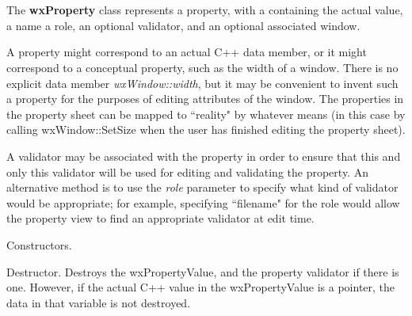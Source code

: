 \section{}\label{wxproperty}

The {\bf wxProperty} class represents a property, with a \rtfsp
containing the actual value, a name a role, an optional validator, and
an optional associated window. 

A property might correspond to an actual C++ data member, or it
might correspond to a conceptual property, such as the width of a window.
There is no explicit data member {\it wxWindow::width}, but it may be convenient
to invent such a property for the purposes of editing attributes of the window.
The properties in the property sheet can be mapped to ``reality" by
whatever means (in this case by calling wxWindow::SetSize when the user has
finished editing the property sheet).

A validator may be associated with the property in order to ensure that this and
only this validator will be used for editing and validating the property.
An alternative method is to use the {\it role} parameter to specify what kind
of validator would be appropriate; for example, specifying ``filename" for the role
would allow the property view to find an appropriate validator at edit time.







Constructors.



Destructor. Destroys the wxPropertyValue, and the property validator if there is one. However, if the
actual C++ value in the wxPropertyValue is a pointer, the data in that variable is not destroyed.


